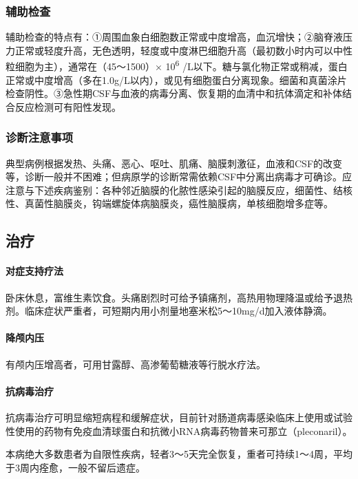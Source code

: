 \subsubsection{辅助检查}

辅助检查的特点有：①周围血象白细胞数正常或中度增高，血沉增快；②脑脊液压力正常或轻度升高，无色透明，轻度或中度淋巴细胞升高（最初数小时内可以中性粒细胞为主），通常在（45～1500）×
10\textsuperscript{6}
/L以下。糖与氯化物正常或稍减，蛋白正常或中度增高（多在1.0g/L以内），或见有细胞蛋白分离现象。细菌和真菌涂片检查阴性。③急性期CSF与血液的病毒分离、恢复期的血清中和抗体滴定和补体结合反应检测可有阳性发现。

\subsubsection{诊断注意事项}

典型病例根据发热、头痛、恶心、呕吐、肌痛、脑膜刺激征，血液和CSF的改变等，诊断一般并不困难；但病原学的诊断常需依赖CSF中分离出病毒才可确诊。应注意与下述疾病鉴别：各种邻近脑膜的化脓性感染引起的脑膜反应，细菌性、结核性、真菌性脑膜炎，钩端螺旋体病脑膜炎，癌性脑膜病，单核细胞增多症等。

\subsection{治疗}

\paragraph{对症支持疗法}

卧床休息，富维生素饮食。头痛剧烈时可给予镇痛剂，高热用物理降温或给予退热剂。临床症状严重者，可短期内用小剂量地塞米松5～10mg/d加入液体静滴。

\paragraph{降颅内压}

有颅内压增高者，可用甘露醇、高渗葡萄糖液等行脱水疗法。

\paragraph{抗病毒治疗}

抗病毒治疗可明显缩短病程和缓解症状，目前针对肠道病毒感染临床上使用或试验性使用的药物有免疫血清球蛋白和抗微小RNA病毒药物普来可那立（pleconaril）。

本病绝大多数患者为自限性疾病，轻者3～5天完全恢复，重者可持续1～4周，平均于3周内痊愈，一般不留后遗症。

